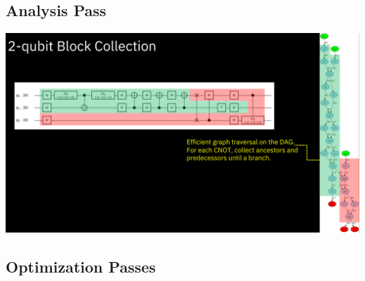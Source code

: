 \documentclass[aspectratio=169,11pt,hyperref={colorlinks=true}]{beamer}
\begin{document}
\subsection{Analysis Pass}
{
\begin{frame}
    \includegraphics[width=\textwidth]{block_collection.png}
\end{frame}
}

\subsection{Optimization Passes}
\end{document}
